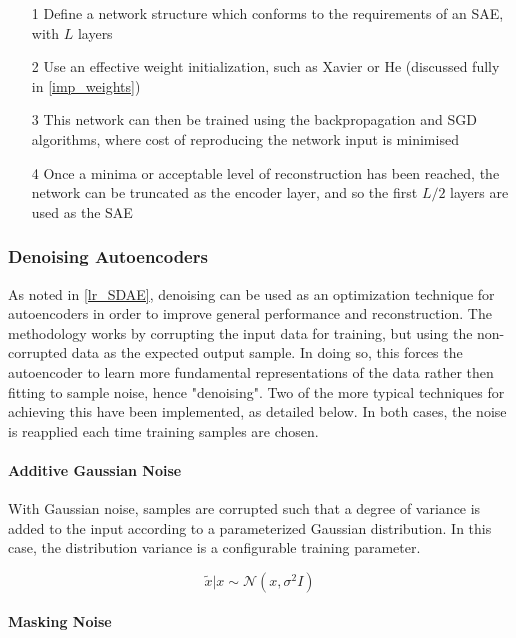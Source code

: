 \documentclass[a4paper,11pt,oneside]{article}
\theoremstyle{plain}
\theoremstyle{definition}
\begin{document}
	\begin{itemize}
		\item [1] Define a network structure which conforms to the requirements of an SAE, with $L$ layers
		\item [2] Use an effective weight initialization, such as Xavier or He (discussed fully in \ref{imp_weights})
		\item [3] This network can then be trained using the backpropagation and SGD algorithms, where cost of reproducing the network input is minimised
		\item [4] Once a minima or acceptable level of reconstruction has been reached, the network can be truncated as the encoder layer, and so the first $L/2$ layers are used as the SAE
	\end{itemize}
	
	\subsubsection{Denoising Autoencoders}
	
	As noted in \ref{lr_SDAE}, denoising can be used as an optimization technique for autoencoders in order to improve general performance and reconstruction. The methodology works by corrupting the input data for training, but using the non-corrupted data as the expected output sample. In doing so, this forces the autoencoder to learn more fundamental representations of the data rather then fitting to sample noise, hence "denoising". Two of the more typical techniques for achieving this have been implemented, as detailed below. In both cases, the noise is reapplied each time training samples are chosen.
	
	\paragraph{Additive Gaussian Noise}
	
	With Gaussian noise, samples are corrupted such that a degree of variance is added to the input according to a parameterized Gaussian distribution. In this case, the distribution variance is a configurable training parameter.
	
	\begin{equation}
	\tilde{{x}} | {x} \sim \mathcal{N}\left({x}, \sigma^{2} I\right)
	\end{equation}
	
	\paragraph{Masking Noise}
	
\end{document}
